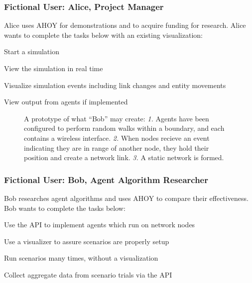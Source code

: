 \documentclass[titlepage]{article}
\begin{document}

\subsubsection{Fictional User: Alice, Project Manager%
  \label{alice}%
}

Alice uses AHOY for demonstrations and to acquire funding for research.  Alice wants to complete the tasks below with an existing visualization:

\begin{itemize*}
    \item Start a simulation
    \item View the simulation in real time
    \item Visualize simulation events including link changes and entity movements
    \item View output from agents if implemented
\end{itemize*}

\begin{figure}
    \centering
    
    \caption[Prototype Use Case Diagram]%
    {A prototype of what ``Bob'' may create: \emph{1.} Agents have been configured to perform random walks within a boundary, and each contains a wireless interface. \emph{2.} When nodes recieve an event indicating they are in range of another node, they hold their position and create a network link. \emph{3.} A static network is formed.}   
\end{figure}

\subsubsection{Fictional User: Bob, Agent Algorithm Researcher%
  \label{bob}%
}

Bob researches agent algorithms and uses AHOY to compare their effectiveness.  Bob wants to complete the tasks below:

\begin{itemize*}
    \item Use the API to implement agents which run on network nodes
    \item Use a visualizer to assure scenarios are properly setup
    \item Run scenarios many times, without a visualization
    \item Collect aggregate data from scenario trials via the API
\end{itemize*}
\end{document}

